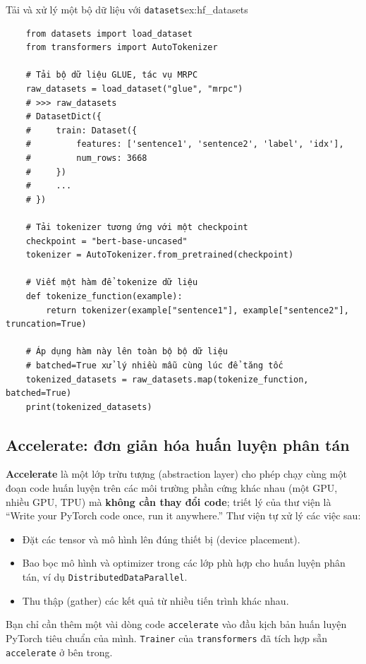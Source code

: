 \begin{example}{Tải và xử lý một bộ dữ liệu với \texttt{datasets}}{ex:hf_datasets}
    \begin{verbatim}
    from datasets import load_dataset
    from transformers import AutoTokenizer

    # Tải bộ dữ liệu GLUE, tác vụ MRPC
    raw_datasets = load_dataset("glue", "mrpc")
    # >>> raw_datasets
    # DatasetDict({
    #     train: Dataset({
    #         features: ['sentence1', 'sentence2', 'label', 'idx'],
    #         num_rows: 3668
    #     })
    #     ...
    # })

    # Tải tokenizer tương ứng với một checkpoint
    checkpoint = "bert-base-uncased"
    tokenizer = AutoTokenizer.from_pretrained(checkpoint)

    # Viết một hàm để tokenize dữ liệu
    def tokenize_function(example):
        return tokenizer(example["sentence1"], example["sentence2"], truncation=True)

    # Áp dụng hàm này lên toàn bộ bộ dữ liệu
    # batched=True xử lý nhiều mẫu cùng lúc để tăng tốc
    tokenized_datasets = raw_datasets.map(tokenize_function, batched=True)
    print(tokenized_datasets)
    \end{verbatim}
\end{example}

\subsection{Accelerate: đơn giản hóa huấn luyện phân tán}
\label{ssec:hf_accelerate}
\textbf{Accelerate} là một lớp trừu tượng (abstraction layer) cho phép chạy cùng một đoạn code huấn luyện trên các môi trường phần cứng khác nhau (một GPU, nhiều GPU, TPU) mà \textbf{không cần thay đổi code}; triết lý của thư viện là “Write your PyTorch code once, run it anywhere.” Thư viện tự xử lý các việc sau:
\begin{itemize}
    \item Đặt các tensor và mô hình lên đúng thiết bị (device placement).
    \item Bao bọc mô hình và optimizer trong các lớp phù hợp cho huấn luyện phân tán, ví dụ \texttt{Distributed\allowbreak Data\allowbreak Parallel}.
    \item Thu thập (gather) các kết quả từ nhiều tiến trình khác nhau.
\end{itemize}
Bạn chỉ cần thêm một vài dòng code \texttt{accelerate} vào đầu kịch bản huấn luyện PyTorch tiêu chuẩn của mình. \texttt{Trainer} của \texttt{transformers} đã tích hợp sẵn \texttt{accelerate} ở bên trong.

